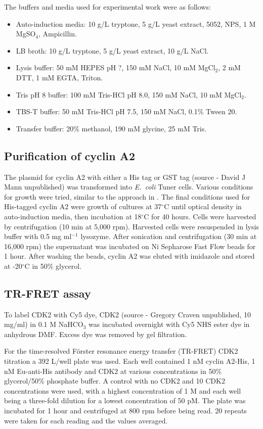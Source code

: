 The buffers and media used for experimental work were as follows:
\begin{itemize}
\item Auto-induction media: 10 g/L tryptone, 5 g/L yeast extract, 5052, NPS, 1 M MgSO$_{4}$, Ampicillin.
\item LB broth: 10 g/L tryptone, 5 g/L yeast extract, 10 g/L NaCl.
\item Lysis buffer: 50 mM HEPES pH ?, 150 mM NaCl, 10 mM MgCl$_{2}$, 2 mM DTT, 1 mM EGTA, Triton.
\item Tris pH 8 buffer: 100 mM Tris-HCl pH 8.0, 150 mM NaCl, 10 mM MgCl$_{2}$.
\item TBS-T buffer: 50 mM Tris-HCl pH 7.5, 150 mM NaCl, 0.1\% Tween 20.
\item Transfer buffer: 20\% methanol, 190 mM glycine, 25 mM Tris.
\end{itemize}


\subsection{Purification of cyclin A2}

The plasmid for cyclin A2 with either a His tag or GST tag (source - David J Mann unpublished) was transformed into \textit{E.\ coli} Tuner cells.
Various conditions for growth were tried, similar to the approach in \cite{Wang2007}.
The final conditions used for His-tagged cyclin A2 were growth of cultures at 37$^{\circ}$C until optical density in auto-induction media, then incubation at 18$^{\circ}$C for 40 hours.
Cells were harvested by centrifugation (10 min at 5,000 rpm).
Harvested cells were resuspended in lysis buffer with 0.5 mg ml$^{-1}$ lysozyme.
After sonication and centrifugation (30 min at 16,000 rpm) the supernatant was incubated on Ni Sepharose Fast Flow beads for 1 hour.
After washing the beads, cyclin A2 was eluted with imidazole and stored at -20$^{\circ}$C in 50\% glycerol.


\subsection{TR-FRET assay}

To label CDK2 with Cy5 dye, CDK2 (source - Gregory Craven unpublished, 10 mg/ml) in 0.1 M NaHCO$_{3}$ was incubated overnight with Cy5 NHS ester dye in anhydrous DMF.
Excess dye was removed by gel filtration.

For the time-resolved F\"{o}rster resonance energy transfer (TR-FRET) CDK2 titration a 392 \textmu L/well plate was used.
Each well contained 1 nM cyclin A2-His, 1 nM Eu-anti-His antibody and CDK2 at various concentrations in 50\% glycerol/50\% phosphate buffer.
A control with no CDK2 and 10 CDK2 concentrations were used, with a highest concentration of 1 \textmu M and each well being a three-fold dilution for a lowest concentration of 50 pM.
The plate was incubated for 1 hour and centrifuged at 800 rpm before being read.
20 repeats were taken for each reading and the values averaged.


